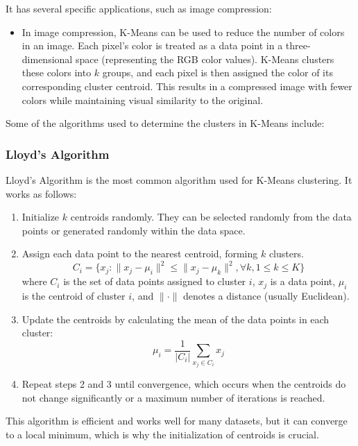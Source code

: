 It has several specific applications, such as image compression:
\begin{itemize}
    \item In image compression, K-Means can be used to reduce the number of colors in an image. Each pixel's color is treated as a data point in a three-dimensional space (representing the RGB color values). K-Means clusters these colors into $k$ groups, and each pixel is then assigned the color of its corresponding cluster centroid. This results in a compressed image with fewer colors while maintaining visual similarity to the original.
\end{itemize}

Some of the algorithms used to determine the clusters in K-Means include:
\subsubsection{Lloyd's Algorithm}
Lloyd's Algorithm is the most common algorithm used for K-Means clustering. It works as follows:
\begin{enumerate}
    \item Initialize $k$ centroids randomly. They can be selected randomly from the data points or generated randomly within the data space.
    \item Assign each data point to the nearest centroid, forming $k$ clusters.
    \begin{equation*}
        C_i = \{x_j : \|x_j - \mu_i\|^2 \leq \|x_j - \mu_k\|^2, \forall k, 1 \leq k \leq K\}
    \end{equation*}
    where $C_i$ is the set of data points assigned to cluster $i$, $x_j$ is a data point, $\mu_i$ is the centroid of cluster $i$, and $\|\cdot\|$ denotes a distance (usually Euclidean).
    \item Update the centroids by calculating the mean of the data points in each cluster:
    \begin{equation*}
        \mu_i = \frac{1}{|C_i|} \sum_{x_j \in C_i} x_j
    \end{equation*}
    \item Repeat steps 2 and 3 until convergence, which occurs when the centroids do not change significantly or a maximum number of iterations is reached.
\end{enumerate}

This algorithm is efficient and works well for many datasets, but it can converge to a local minimum, which is why the initialization of centroids is crucial.

